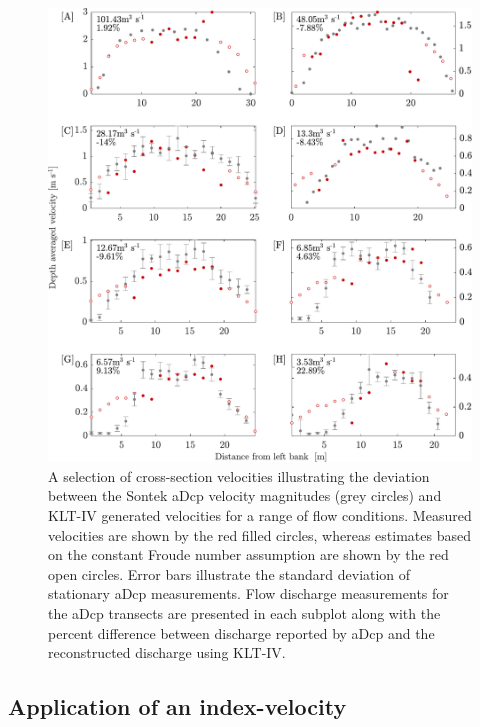 \documentclass[hess, manuscript]{copernicus} %
\begin{document}
\begin{figure}[!htb]
\centering\Large
\includegraphics[width=16cm]{Main/Initial_submission_2024/Figures/Figure5.pdf}
\caption{A selection of cross-section velocities illustrating the deviation between the Sontek aDcp velocity magnitudes (grey circles) and KLT-IV generated velocities for a range of flow conditions. Measured velocities are shown by the red filled circles, whereas estimates based on the constant Froude number assumption are shown by the red open circles. Error bars illustrate the standard deviation of stationary aDcp measurements. Flow discharge measurements for the aDcp transects are presented in each subplot along with the percent difference between discharge reported by aDcp and the reconstructed discharge using KLT-IV.}
\label{Figure5} 
\end{figure}

\FloatBarrier

\subsection{Application of an index-velocity}
\end{document}

